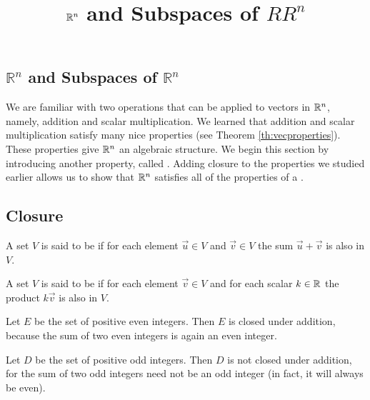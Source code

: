 \documentclass{ximera}
\title{$\mathbb{R}^n$ and Subspaces of $RR^n$} \license{CC BY-NC-SA 4.0}
\begin{document}
\begin{abstract}
\end{abstract}

\maketitle

\begin{onlineOnly}
\section*{$\mathbb{R}^n$ and Subspaces of $\mathbb{R}^n$}
\end{onlineOnly}


We are familiar with two operations that can be applied to vectors in $\mathbb{R}^n$, namely, addition and scalar multiplication. We learned that addition and scalar multiplication satisfy many nice properties (see Theorem \ref{th:vecproperties}). These properties give $\mathbb{R}^n$ an algebraic structure.  We begin this section by introducing another property, called .  Adding closure to the properties we studied earlier allows us to show that $\mathbb{R}^n$ satisfies all of the properties of a .  

\subsection*{Closure}
 \begin{definition} \label{def:closedunderaddition}
  A set $V$ is said to be  if for each element $\vec{u} \in V$ and $\vec{v} \in V$ the sum $\vec{u}+\vec{v}$ is also in $V$.
\end{definition}

  \begin{definition} \label{def:closedunderscalarmult}
  A set $V$ is said to be  if for each element $\vec{v} \in V$  and for each scalar $k \in \mathbb{R}$ the product $k\vec{v}$ is also in $V$.
\end{definition}


\begin{example}\label{ex:posevenint}
Let $E$ be the set of positive even integers.  Then $E$ is closed under addition, because the sum of two even integers is again an even integer.
\end{example}

\begin{example}\label{ex:posoddint}
Let $D$ be the set of positive odd integers.  Then $D$ is not closed under addition, for the sum of two odd integers need not be an odd integer (in fact, it will always be even).
\end{example}
\end{document}
